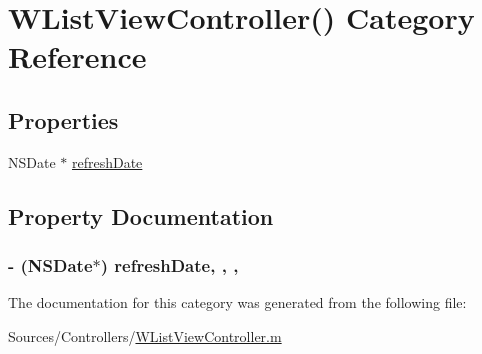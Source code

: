 \hypertarget{category_w_list_view_controller_07_08}{\section{W\-List\-View\-Controller() Category Reference}
\label{category_w_list_view_controller_07_08}
}
\subsection*{Properties}
\begin{DoxyCompactItemize}
\item 
N\-S\-Date $\ast$ \hyperlink{category_w_list_view_controller_07_08_aa382c12c1fa2dc0210c6937ec05648dd}{refresh\-Date}
\end{DoxyCompactItemize}


\subsection{Property Documentation}
\hypertarget{category_w_list_view_controller_07_08_aa382c12c1fa2dc0210c6937ec05648dd}{
\subsubsection[{refresh\-Date}]{\setlength{\rightskip}{0pt plus 5cm}-\/ (N\-S\-Date$\ast$) refresh\-Date\hspace{0.3cm}{\ttfamily [read]}, {\ttfamily [write]}, {\ttfamily [nonatomic]}, {\ttfamily [retain]}}}\label{category_w_list_view_controller_07_08_aa382c12c1fa2dc0210c6937ec05648dd}


The documentation for this category was generated from the following file\-:\begin{DoxyCompactItemize}
\item 
Sources/\-Controllers/\hyperlink{_w_list_view_controller_8m}{W\-List\-View\-Controller.\-m}\end{DoxyCompactItemize}
